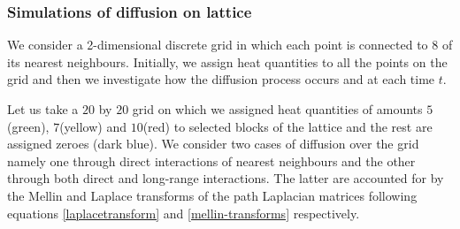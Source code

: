 \documentclass[10pt,a4paper]{article}
\begin{document}
    \subsubsection{Simulations of diffusion on lattice}
    We consider a 2-dimensional discrete grid in which each point is connected to 8 of its nearest neighbours. Initially, we assign heat quantities to all the points on the grid and then we investigate how the diffusion process occurs and at each time $t$. 
    
    Let us take a $20$ by $20$ grid on which we assigned heat quantities of amounts $5$(green), $7$(yellow) and $10$(red) to selected blocks of the lattice and the rest are assigned zeroes (dark blue). We consider two cases of diffusion over the grid namely one through direct interactions of nearest neighbours and the other through both direct and long-range interactions. The latter are accounted for by the Mellin and Laplace transforms of the path Laplacian matrices following equations \ref{laplacetransform} and \ref{mellin-transforms} respectively.
    
\end{document}
